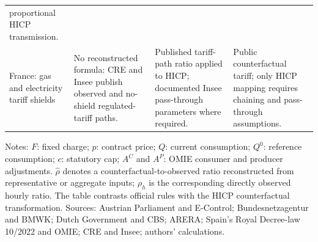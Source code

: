 \begin{minipage}{\linewidth}
\begin{tabularx}{\linewidth}{@{}p{1.7cm}p{4.25cm}Xp{4.0cm}@{}}
proportional HICP transmission. \tabularnewline
\addlinespace
France: gas and electricity tariff shields
& No reconstructed formula: CRE and Insee publish observed and no-shield
regulated-tariff paths.
& Published tariff-path ratio applied to HICP; documented Insee pass-through
parameters where required.
& Public counterfactual tariff; only HICP mapping requires chaining and
pass-through assumptions. \tabularnewline
\bottomrule
\end{tabularx}
\begin{flushleft}
\fontsize{7.0}{7.9}\selectfont Notes: $F$: fixed charge; $p$: contract price;
$Q$: current consumption; $Q^{0}$: reference consumption; $c$: statutory cap;
$A^{C}$ and $A^{P}$: OMIE consumer and producer adjustments. $\widehat{\rho}$ denotes a
counterfactual-to-observed ratio reconstructed from representative or aggregate inputs; $\rho_h$
is the corresponding directly observed hourly ratio. The table contrasts
official rules with the HICP counterfactual transformation. Sources: Austrian Parliament and
E-Control; Bundesnetzagentur and BMWK; Dutch Government and CBS; ARERA; Spain's Royal Decree-law 10/2022 and
OMIE; CRE and Insee; authors' calculations.
\end{flushleft}
\end{minipage}
